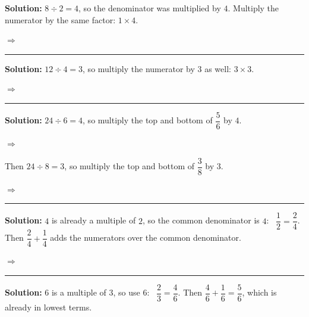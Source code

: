 \documentclass[12pt]{article}
\begin{document}




\textbf{Solution:} $8 \div 2 = 4$, so the denominator was multiplied by $4$. Multiply the numerator by the same factor: $1 \times 4$.

$\Rightarrow$ 

\vspace{0.15cm}\noindent\rule{\linewidth}{0.2pt}


\textbf{Solution:} $12 \div 4 = 3$, so multiply the numerator by $3$ as well: $3 \times 3$.

$\Rightarrow$ 

\vspace{0.15cm}\noindent\rule{\linewidth}{0.2pt}


\textbf{Solution:} $24 \div 6 = 4$, so multiply the top and bottom of $\dfrac{5}{6}$ by $4$.

$\Rightarrow$ 

Then $24 \div 8 = 3$, so multiply the top and bottom of $\dfrac{3}{8}$ by $3$.

$\Rightarrow$ 

\vspace{0.15cm}\noindent\rule{\linewidth}{0.2pt}


\textbf{Solution:} $4$ is already a multiple of $2$, so the common denominator is $4$: \ $\dfrac{1}{2} = \dfrac{2}{4}$. Then $\dfrac{2}{4} + \dfrac{1}{4}$ adds the numerators over the common denominator.

$\Rightarrow$ 

\vspace{0.15cm}\noindent\rule{\linewidth}{0.2pt}


\textbf{Solution:} $6$ is a multiple of $3$, so use $6$: \ $\dfrac{2}{3} = \dfrac{4}{6}$. Then $\dfrac{4}{6} + \dfrac{1}{6} = \dfrac{5}{6}$, which is already in lowest terms.
\end{document}
